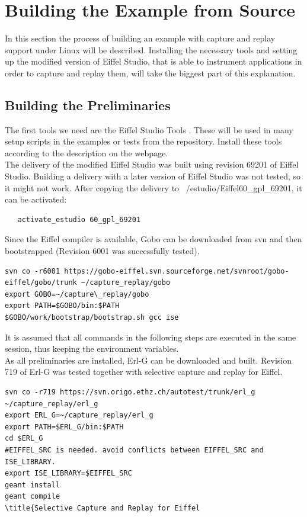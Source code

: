 \section{Building the Example from Source}
\sloppy %
In this section the process of building an example with capture and replay support under Linux will be described. Installing the necessary tools and setting up the modified version of Eiffel Studio, that is able to instrument applications in order to capture and replay them, will take the biggest part of this explanation.\\


\subsection{Building the Preliminaries}
The first tools we need are the  Eiffel Studio Tools \cite{estudiotools}. These will be used in many setup scripts in the examples or tests from the repository. Install these tools according to the description on the webpage.\\

The delivery of the modified Eiffel Studio was built using revision 69201 of Eiffel Studio. Building a delivery with a later version of Eiffel Studio was not tested, so it might not work. After copying the delivery to ~/estudio/Eiffel60\_gpl\_69201, it can be activated:
\bashlisting
\begin{lstlisting}
   activate_estudio 60_gpl_69201
\end{lstlisting}

Since the Eiffel compiler is available, Gobo \cite{gobo} can be downloaded from svn and then bootstrapped (Revision 6001 was successfully tested).
\begin{lstlisting}
svn co -r6001 https://gobo-eiffel.svn.sourceforge.net/svnroot/gobo-eiffel/gobo/trunk ~/capture_replay/gobo
export GOBO=~/capture\_replay/gobo
export PATH=$GOBO/bin:$PATH
$GOBO/work/bootstrap/bootstrap.sh gcc ise
\end{lstlisting}

It is assumed that all commands in the following steps are executed in the same session, thus keeping the environment variables.\\
As all preliminaries are installed, Erl-G \cite{erlg} can be downloaded and built. Revision 719 of Erl-G was tested together with selective capture and replay for Eiffel.
\begin{lstlisting}
svn co -r719 https://svn.origo.ethz.ch/autotest/trunk/erl_g ~/capture_replay/erl_g
export ERL_G=~/capture_replay/erl_g
export PATH=$ERL_G/bin:$PATH
cd $ERL_G
#EIFFEL_SRC is needed. avoid conflicts between EIFFEL_SRC and ISE_LIBRARY.
export ISE_LIBRARY=$EIFFEL_SRC
geant install
geant compile
\title{Selective Capture and Replay for Eiffel
\end{lstlisting}

